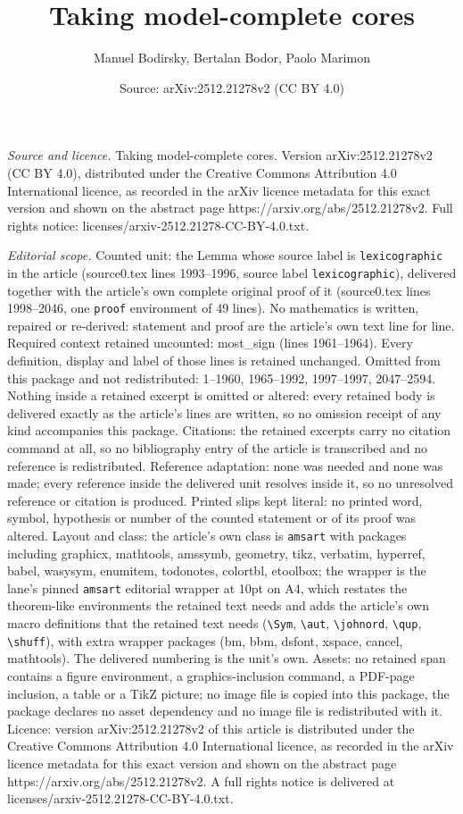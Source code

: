 \documentclass[10pt,a4paper]{amsart}
\title[Taking model-complete cores]{Taking model-complete cores}
\author{Manuel Bodirsky, Bertalan Bodor, Paolo Marimon}
\date{Source: arXiv:2512.21278v2 (CC BY 4.0)}
\begin{document}
\maketitle

\noindent\emph{Source and licence.} Taking model-complete cores. Version arXiv:2512.21278v2 (CC BY 4.0), distributed under the Creative Commons Attribution 4.0 International licence, as recorded in the arXiv licence metadata for this exact version and shown on the abstract page https://arxiv.org/abs/2512.21278v2. Full rights notice: licenses/arxiv-2512.21278-CC-BY-4.0.txt.\par\smallskip

\noindent\textit{Editorial scope.} Counted unit: the Lemma whose source label is \texttt{lexicographic} in the article (source0.tex lines 1993--1996, source label \texttt{lexicographic}), delivered together with the article's own complete original proof of it (source0.tex lines 1998--2046, one \texttt{proof} environment of 49 lines). No mathematics is written, repaired or re-derived: statement and proof are the article's own text line for line. Required context retained uncounted: most\_sign (lines 1961--1964). Every definition, display and label of those lines is retained unchanged. Omitted from this package and not redistributed: 1--1960, 1965--1992, 1997--1997, 2047--2594. Nothing inside a retained excerpt is omitted or altered: every retained body is delivered exactly as the article's lines are written, so no omission receipt of any kind accompanies this package. Citations: the retained excerpts carry no citation command at all, so no bibliography entry of the article is transcribed and no reference is redistributed. Reference adaptation: none was needed and none was made; every reference inside the delivered unit resolves inside it, so no unresolved reference or citation is produced. Printed slips kept literal: no printed word, symbol, hypothesis or number of the counted statement or of its proof was altered. Layout and class: the article's own class is \texttt{amsart} with packages including graphicx, mathtools, amssymb, geometry, tikz, verbatim, hyperref, babel, wasysym, enumitem, todonotes, colortbl, etoolbox; the wrapper is the lane's pinned \texttt{amsart} editorial wrapper at 10pt on A4, which restates the theorem-like environments the retained text needs and adds the article's own macro definitions that the retained text needs (\texttt{\textbackslash Sym}, \texttt{\textbackslash aut}, \texttt{\textbackslash johnord}, \texttt{\textbackslash qup}, \texttt{\textbackslash shuff}), with extra wrapper packages (bm, bbm, dsfont, xspace, cancel, mathtools). The delivered numbering is the unit's own. Assets: no retained span contains a figure environment, a graphics-inclusion command, a PDF-page inclusion, a table or a TikZ picture; no image file is copied into this package, the package declares no asset dependency and no image file is redistributed with it. Licence: version arXiv:2512.21278v2 of this article is distributed under the Creative Commons Attribution 4.0 International licence, as recorded in the arXiv licence metadata for this exact version and shown on the abstract page https://arxiv.org/abs/2512.21278v2. A full rights notice is delivered at licenses/arxiv-2512.21278-CC-BY-4.0.txt. 
\end{document}
